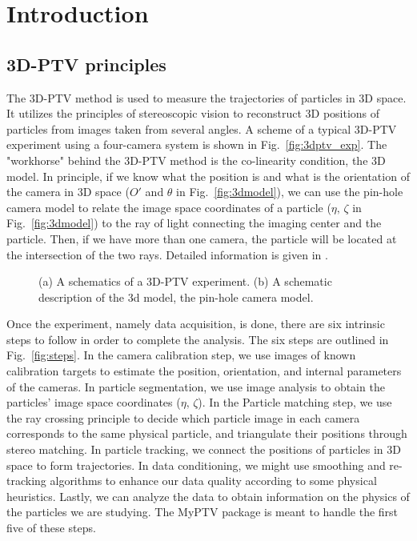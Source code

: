 \documentclass[10pt,a4paper]{article}
\begin{document}
\section{Introduction}

\subsection{3D-PTV principles}


The 3D-PTV method is used to measure the trajectories of particles in 3D space. It utilizes the principles of stereoscopic vision to reconstruct 3D positions of particles from images taken from several angles. A scheme of a typical 3D-PTV experiment using a four-camera system is shown in Fig.~\ref{fig:3dptv_exp}. The "workhorse" behind the 3D-PTV method is the co-linearity condition, the 3D model. In principle, if we know what the position is and what is the orientation of the camera in 3D space ($O'$ and $\theta$ in Fig.~\ref{fig:3dmodel}), we can use the pin-hole camera model to relate the image space coordinates of a particle ($\eta,\, \zeta$ in Fig.~\ref{fig:3dmodel}) to the ray of light connecting the imaging center and the particle. Then, if we have more than one camera, the particle will be located at the intersection of the two rays. Detailed information is given in \cite{Virant1997, Maas1993}.  


\begin{figure}[!ht]
	\centering
	\hfill
	\caption{(a) A schematics of a 3D-PTV experiment. (b) A schematic description of the 3d model, the pin-hole camera model.}
\end{figure}



Once the experiment, namely data acquisition, is done, there are six intrinsic steps to follow in order to complete the analysis. The six steps are outlined in Fig.~\ref{fig:steps}. In the camera calibration step, we use images of known calibration targets to estimate the position, orientation, and internal parameters of the cameras. In particle segmentation, we use image analysis to obtain the particles' image space coordinates ($\eta, \, \zeta$). In the Particle matching step, we use the ray crossing principle to decide which particle image in each camera corresponds to the same physical particle, and triangulate their positions through stereo matching. In particle tracking, we connect the positions of particles in 3D space to form trajectories. In data conditioning, we might use smoothing and re-tracking algorithms to enhance our data quality according to some physical heuristics. Lastly, we can analyze the data to obtain information on the physics of the particles we are studying. The MyPTV package is meant to handle the first five of these steps.    
\end{document}
